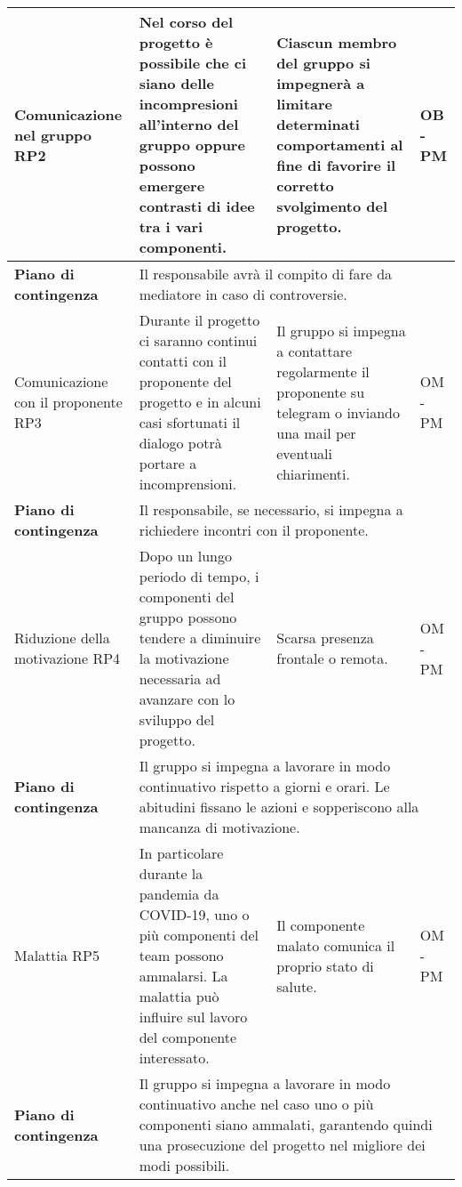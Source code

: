 \begin{center}
\begin{longtable}{|p{}|p{}|p{}|p{}|}
		\hline
		\centering Comunicazione nel gruppo RP2& Nel corso del progetto è possibile che ci siano delle incompresioni all'interno del gruppo oppure possono emergere contrasti di idee tra i vari componenti. &Ciascun membro del gruppo si impegnerà a limitare determinati comportamenti al fine di favorire il corretto svolgimento del progetto. & OB - PM \\
		\hline
		\centering \textbf{Piano di contingenza} & \multicolumn{3}{p{0.84\textwidth}}{Il responsabile avrà il compito di fare da mediatore in caso di controversie.} \\
		\hline
		\centering Comunicazione con il proponente RP3& Durante il progetto ci saranno continui contatti con il proponente del progetto e in alcuni casi sfortunati il dialogo potrà portare a incomprensioni.& Il gruppo si impegna a contattare regolarmente il proponente su telegram o inviando una mail per eventuali chiarimenti. & OM - PM \\
		\hline
		\centering \textbf{Piano di contingenza} & \multicolumn{3}{p{0.84\textwidth}}{Il responsabile, se necessario, si impegna a richiedere incontri con il proponente.} \\
		\hline
		\centering Riduzione della motivazione RP4& Dopo un lungo periodo di tempo, i componenti del gruppo possono tendere a diminuire la motivazione necessaria ad avanzare con lo sviluppo del progetto.& Scarsa presenza frontale o remota. & OM - PM \\
		\hline
		\centering \textbf{Piano di contingenza} & \multicolumn{3}{p{0.84\textwidth}}{Il gruppo si impegna a lavorare in modo continuativo rispetto a giorni e orari. Le abitudini fissano le azioni e sopperiscono alla mancanza di motivazione.} \\
		\hline	
		\centering Malattia RP5& In particolare durante la pandemia da COVID-19, uno o più componenti del team possono ammalarsi. La malattia può influire sul lavoro del componente interessato.& Il componente malato comunica il proprio stato di salute. & OM - PM \\
		\hline
		\centering \textbf{Piano di contingenza} & \multicolumn{3}{p{0.84\textwidth}}{Il gruppo si impegna a lavorare in modo continuativo anche nel caso uno o più componenti siano ammalati, garantendo quindi una prosecuzione del progetto nel migliore dei modi possibili.} \\
		\hline			
	\end{longtable}
\end{center}
